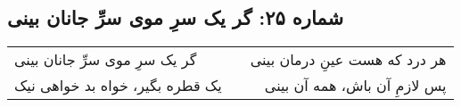 \begin{center}
\section*{شماره ۲۵: گر یک سرِ موی سرِّ جانان بینی}
\label{sec:025}
\begin{longtable}{l p{0.5cm} r}
گر یک سرِ موی سرِّ جانان بینی
&&
هر درد که هست عینِ درمان بینی
\\
یک قطره بگیر، خواه بد خواهی نیک
&&
پس لازمِ آن باش، همه آن بینی
\\
\end{longtable}
\end{center}
